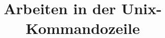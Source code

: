 

\title[Unix]{Arbeiten in der Unix-Kommandozeile}



{
  \begin{frame}
    \titlepage
  \end{frame}
}




